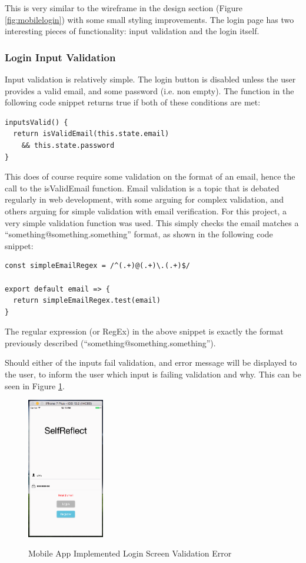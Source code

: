 \documentclass[11pt,openright,a4paper]{report}
\begin{document}
This is very similar to the wireframe in the design section (Figure \ref{fig:mobilelogin}) with some small styling improvements. The login page has two interesting pieces of functionality: input validation and the login itself.

\subsubsection{Login Input Validation}
Input validation is relatively simple. The login button is disabled unless the user provides a valid email, and some password (i.e. non empty). The function in the following code snippet returns true if both of these conditions are met:

\begin{lstlisting}
inputsValid() {
  return isValidEmail(this.state.email)
    && this.state.password
}
\end{lstlisting}

This does of course require some validation on the format of an email, hence the call to the isValidEmail function. Email validation is a topic that is debated regularly in web development, with some arguing for complex validation, and others arguing for simple validation with email verification. For this project, a very simple validation function was used. This simply checks the email matches a \enquote{something@something.something} format, as shown in the following code snippet:

\begin{lstlisting}
const simpleEmailRegex = /^(.+)@(.+)\.(.+)$/

export default email => {
  return simpleEmailRegex.test(email)
}
\end{lstlisting}

The regular expression (or RegEx) in the above snippet is exactly the format previously described (\enquote{something@something.something}).

Should either of the inputs fail validation, and error message will be displayed to the user, to inform the user which input is failing validation and why. This can be seen in Figure \ref{fig:mobileloginerror}.

\begin{figure}[ht]
\centering
\caption{Mobile App Implemented Login Screen Validation Error}
\includegraphics[width=0.3\textwidth]{i/mobileloginerror.png}
\label{fig:mobileloginerror}
\end{figure}
\end{document}
